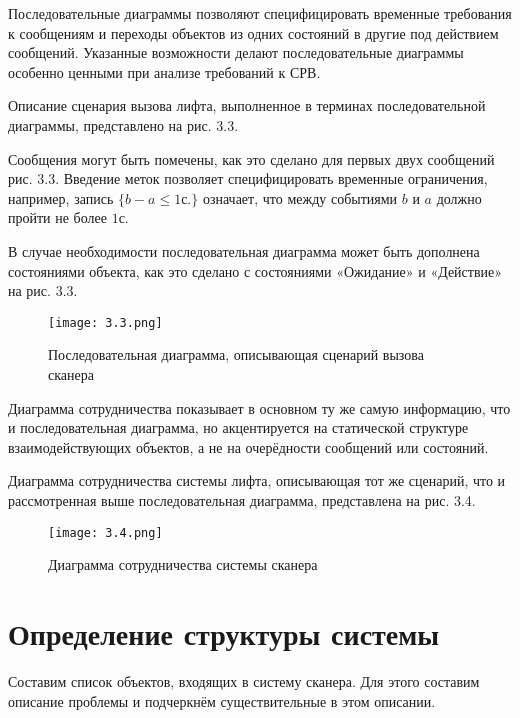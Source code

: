\documentclass[12pt]{article}
\let\oldsection\section
\renewcommand{\section}[1]{
    \oldsection{#1}
    \setcounter{table}{0}
    \setcounter{figure}{0}
}
\begin{document}
    Последовательные диаграммы позволяют специфицировать временные требования к сообщениям и переходы объектов из одних состояний в другие под действием сообщений. Указанные возможности делают последовательные диаграммы особенно ценными при анализе требований к СРВ.

    Описание сценария вызова лифта, выполненное в терминах последовательной диаграммы, представлено на рис. 3.3.

    Сообщения могут быть помечены, как это сделано для первых двух сообщений рис. 3.3. Введение меток позволяет специфицировать временные ограничения, например, запись $\{ b - a \leq 1\text{с.}\}$ означает, что между событиями $b$ и $a$ должно пройти не более $1\text{с.}$

    В случае необходимости последовательная диаграмма может быть дополнена состояниями объекта, как это сделано с состояниями «Ожидание» и «Действие» на рис. 3.3.

    \newpage

    \begin{figure}[h]
        \texttt{[image: 3.3.png]}
        \centering
        \caption{Последовательная диаграмма, описывающая сценарий вызова сканера}
    \end{figure}

    \newpage

    Диаграмма сотрудничества показывает в основном ту же самую информацию, что и последовательная диаграмма, но акцентируется на статической структуре взаимодействующих объектов, а не на очерёдности сообщений или состояний.

    Диаграмма сотрудничества системы лифта, описывающая тот же сценарий, что и рассмотренная выше последовательная диаграмма, представлена на рис. 3.4.

    \begin{figure}[h]
        \texttt{[image: 3.4.png]}
        \centering
        \caption{Диаграмма сотрудничества системы сканера}
    \end{figure}

    \newpage

    \section{Определение структуры системы}

    Составим список объектов, входящих в систему сканера. Для этого составим описание проблемы и подчеркнём существительные в этом описании.
\end{document}
